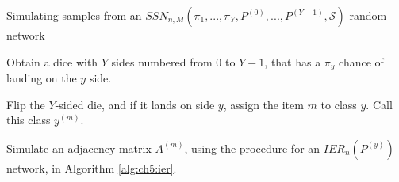 \begin{algorithm}[h]\caption{Simulating samples from an $SSN_{n, M}(\pi_1, ..., \pi_Y, P^{(0)}, ..., P^{(Y-1)}, \mathcal S)$ random network}
\label{alg:ch5:ssn}
\SetAlgoLined
{}

Obtain a dice with $Y$ sides numbered from $0$ to $Y-1$, that has a $\pi_y$ chance of landing on the $y$ side.

 {
    Flip the $Y$-sided die, and if it lands on side $y$, assign the item $m$ to class $y$. Call this class $y^{(m)}$.

    Simulate an adjacency matrix $A^{(m)}$, using the procedure for an $IER_n(P^{(y)})$ network, in Algorithm \ref{alg:ch5:ier}.
}

\end{algorithm}
